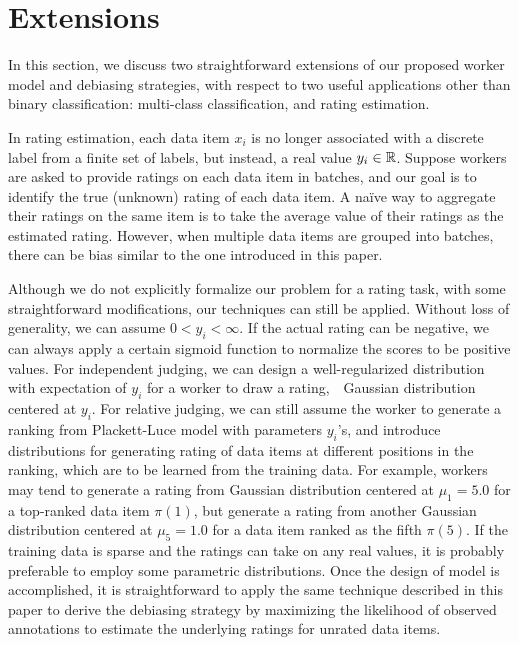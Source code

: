 
\section{Extensions}
\label{sec:ext}

In this section, we discuss two straightforward extensions of our proposed worker model and debiasing strategies, 
with respect to two useful applications other than binary classification: 
multi-class classification, and rating estimation.  

In rating estimation,%
each data item $x_i$ is no longer associated with a discrete label
from a finite set of labels, 
but instead, a real value $y_i \in {\mathbb{R}}$.  
Suppose workers are asked to provide ratings on each data item in batches, 
and our goal is to identify the true (unknown) rating of each data item.  
A na\"{i}ve way to aggregate their ratings on the same item 
is to take the average value of their ratings as the estimated rating.  
However, when multiple data items are grouped into batches, 
there can be bias similar to the one introduced in this paper.

Although we do not explicitly formalize our problem for a rating task, 
with some straightforward modifications, 
our techniques can still be applied.  
Without loss of generality, we can assume $0 < y_i < \infty$.  
If the actual rating can be negative, 
we can always apply a certain sigmoid function to normalize the scores to be positive values.  
For independent judging, we can design a well-regularized distribution with expectation of $y_i$ 
for a worker to draw a rating,~\eg~Gaussian distribution centered at $y_i$.  
For relative judging, we can still assume the worker to generate a ranking from Plackett-Luce model with parameters $y_i$'s, 
and introduce distributions for generating rating of data items at different positions in the ranking, 
which are to be learned from the training data.  
For example, workers may tend to generate a rating from Gaussian distribution centered at $\mu_1=5.0$ for a top-ranked data item $\pi(1)$, 
but generate a rating from another Gaussian distribution centered at $\mu_5=1.0$ for a data item ranked as the fifth $\pi(5)$.  
If the training data is sparse and the ratings can take on any real values, 
it is probably preferable to employ some parametric distributions.    
Once the design of model is accomplished, 
it is straightforward to apply the same technique described in this paper 
to derive the debiasing strategy by maximizing the likelihood of observed annotations 
to estimate the underlying ratings for unrated data items.  


